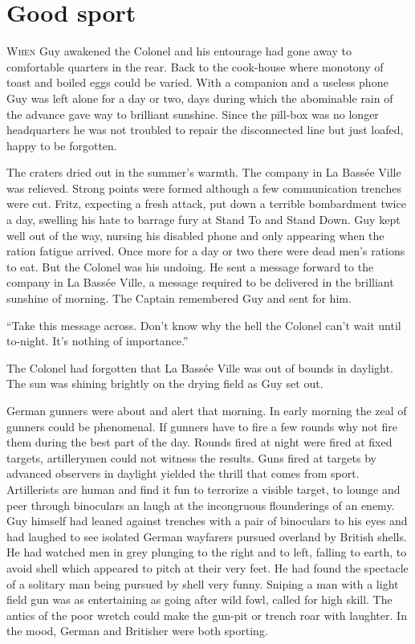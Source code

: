 \chapter*{\textsf{Good sport}}

W\textsc{hen} Guy awakened the Colonel and his entourage had gone away to comfortable quarters in the rear. Back to the cook-house where monotony of toast and boiled eggs could be varied. With a companion and a useless phone Guy was left alone for a day or two, days during which the abominable rain of the advance gave way to brilliant sunshine. Since the pill-box was no longer headquarters he was not troubled to repair the disconnected line but just loafed, happy to be forgotten.

The craters dried out in the summer's warmth. The company in La Bass\'{e}e Ville was relieved. Strong points were formed although a few communication trenches were cut. Fritz, expecting a fresh attack, put down a terrible bombardment twice a day, swelling his hate to barrage fury at Stand To and Stand Down. Guy kept well out of the way, nursing his disabled phone and only appearing when the ration fatigue arrived. Once more for a day or two there were dead men's rations to eat. But the Colonel was his undoing. He sent a message forward to the company in La Bass\'{e}e Ville, a message required to be delivered in the brilliant sunshine of morning. The Captain remembered Guy and sent for him.

``Take this message across. Don't know why the hell the Colonel can't wait until to-night. It's nothing of importance.''

The Colonel had forgotten that La Bass\'{e}e Ville was out of bounds in daylight. The sun was shining brightly on the drying field as Guy set out.

German gunners were about and alert that morning. In early morning the zeal of gunners could be phenomenal. If gunners have to fire a few rounds why not fire them during the best part of the day. Rounds fired at night were fired at fixed targets, artillerymen could not witness the results. Guns fired at targets by advanced observers in daylight yielded the thrill that comes from sport. Artillerists are human and find it fun to terrorize a visible target, to lounge and peer through binoculars an laugh at the incongruous flounderings of an enemy. Guy himself had leaned against trenches with a pair of binoculars to his eyes and had laughed to see isolated German wayfarers pursued overland by British shells. He had watched men in grey plunging to the right and to left, falling to earth, to avoid shell which appeared to pitch at their very feet. He had found the spectacle of a solitary man being pursued by shell very funny. Sniping a man with a light field gun was as entertaining as going after wild fowl, called for high skill. The antics of the poor wretch could make the gun-pit or trench roar with laughter. In the mood, German and Britisher were both sporting.

